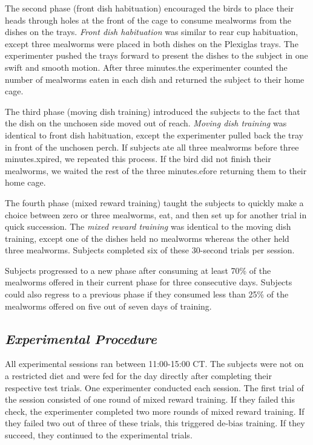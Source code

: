 \documentclass[
  ,pub,floatsintext]{apa6}
\begin{document}
The second phase (front dish habituation) encouraged the birds to place their heads through holes at the front of the cage to consume mealworms from the dishes on the trays. \emph{Front dish habituation} was similar to rear cup habituation, except three mealworms were placed in both dishes on the Plexiglas trays. The experimenter pushed the trays forward to present the dishes to the subject in one swift and smooth motion. After three minutes.the experimenter counted the number of mealworms eaten in each dish and returned the subject to their home cage.

The third phase (moving dish training) introduced the subjects to the fact that the dish on the unchosen side moved out of reach. \emph{Moving dish training} was identical to front dish habituation, except the experimenter pulled back the tray in front of the unchosen perch. If subjects ate all three mealworms before three minutes.xpired, we repeated this process. If the bird did not finish their mealworms, we waited the rest of the three minutes.efore returning them to their home cage.

The fourth phase (mixed reward training) taught the subjects to quickly make a choice between zero or three mealworms, eat, and then set up for another trial in quick succession. The \emph{mixed reward training} was identical to the moving dish training, except one of the dishes held no mealworms whereas the other held three mealworms. Subjects completed six of these 30-second trials per session.

Subjects progressed to a new phase after consuming at least 70\% of the mealworms offered in their current phase for three consecutive days. Subjects could also regress to a previous phase if they consumed less than 25\% of the mealworms offered on five out of seven days of training.

\hypertarget{experimental-procedure}{%
\subsection{\texorpdfstring{\emph{Experimental Procedure}}{Experimental Procedure}}\label{experimental-procedure}}

All experimental sessions ran between 11:00-15:00 CT. The subjects were not on a restricted diet and were fed for the day directly after completing their respective test trials. One experimenter conducted each session. The first trial of the session consisted of one round of mixed reward training. If they failed this check, the experimenter completed two more rounds of mixed reward training. If they failed two out of three of these trials, this triggered de-bias training. If they succeed, they continued to the experimental trials.
\end{document}
